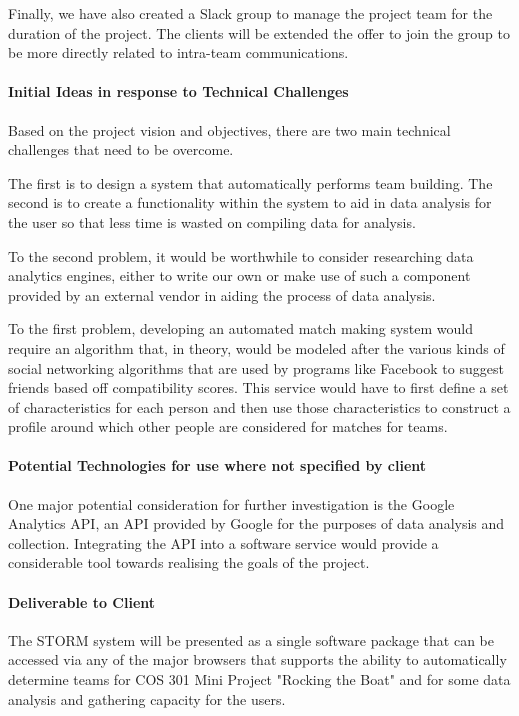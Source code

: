 \documentclass[12pt]{article}
\begin{document}
Finally, we have also created a Slack group to manage the project team for the duration of the project. The clients will be extended the offer to join the group to be more directly related to intra-team communications.
\paragraph{Initial Ideas in response to Technical Challenges}
Based on the project vision and objectives, there are two main technical challenges that need to be overcome.

The first is to design a system that automatically performs team building. The second is to create a functionality within the system to aid in data analysis for the user so that less time is wasted on compiling data for analysis.

To the second problem, it would be worthwhile to consider researching data analytics engines, either to write our own or make use of such a component provided by an external vendor in aiding the process of data analysis.

To the first problem, developing an automated match making system would require an algorithm that, in theory, would be modeled after the various kinds of social networking algorithms that are used by programs like Facebook to suggest friends based off compatibility scores. This service would have to first define a set of characteristics for each person and then use those characteristics to construct a profile around which other people are considered for matches for teams.
\paragraph{Potential Technologies for use where not specified by client}
One major potential consideration for further investigation is the Google Analytics API, an API provided by Google for the purposes of data analysis and collection. Integrating the API into a software service would provide a considerable tool towards realising the goals of the project.
\paragraph{Deliverable to Client}
The STORM system will be presented as a single software package that can be accessed via any of the major browsers that supports the ability to automatically determine teams for COS 301 Mini Project "Rocking the Boat" and for some data analysis and gathering capacity for the users.
\end{document}
